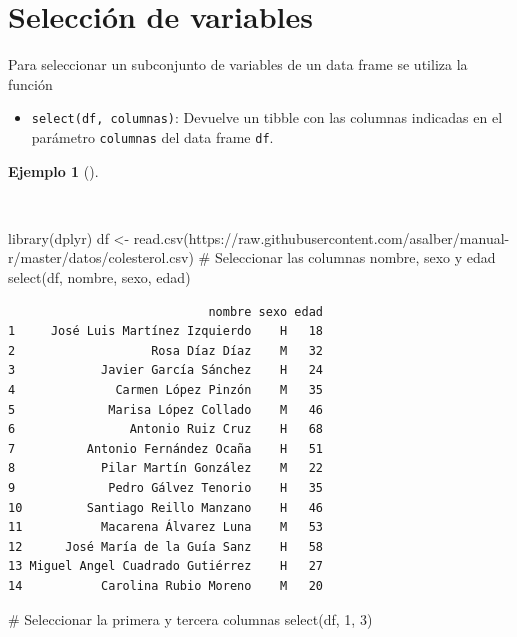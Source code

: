 \documentclass[
  a4paper,
]{scrreport}
\newenvironment{Shaded}{\begin{snugshade}}{\end{snugshade}}
\newcommand{\CommentTok}[1]{\textcolor[rgb]{0.37,0.37,0.37}{#1}}
\newcommand{\DecValTok}[1]{\textcolor[rgb]{0.68,0.00,0.00}{#1}}
\newcommand{\FunctionTok}[1]{\textcolor[rgb]{0.28,0.35,0.67}{#1}}
\newcommand{\NormalTok}[1]{\textcolor[rgb]{0.00,0.23,0.31}{#1}}
\newcommand{\OtherTok}[1]{\textcolor[rgb]{0.00,0.23,0.31}{#1}}
\newcommand{\StringTok}[1]{\textcolor[rgb]{0.13,0.47,0.30}{#1}}
\providecommand{\tightlist}{%
  \setlength{\itemsep}{0pt}\setlength{\parskip}{0pt}}\usepackage{longtable,booktabs,array}
\theoremstyle{definition}
\theoremstyle{definition}
\newtheorem{example}{Ejemplo}[chapter]
\theoremstyle{remark}
\begin{document}
\section{Selección de variables}\label{selecciuxf3n-de-variables}

Para seleccionar un subconjunto de variables de un data frame se utiliza
la función

\begin{itemize}
\tightlist
\item
  \texttt{select(df,\ columnas)}: Devuelve un tibble con las columnas
  indicadas en el parámetro \texttt{columnas} del data frame
  \texttt{df}.
\end{itemize}

\begin{example}[]\protect\hypertarget{exm-select}{}\label{exm-select}

~

\begin{Shaded}
\begin{Highlighting}[]
\FunctionTok{library}\NormalTok{(dplyr)}
\NormalTok{df }\OtherTok{\textless{}{-}} \FunctionTok{read.csv}\NormalTok{(}\StringTok{\textquotesingle{}https://raw.githubusercontent.com/asalber/manual{-}r/master/datos/colesterol.csv\textquotesingle{}}\NormalTok{)}
\CommentTok{\# Seleccionar las columnas nombre, sexo y edad}
\FunctionTok{select}\NormalTok{(df, nombre, sexo, edad)}
\end{Highlighting}
\end{Shaded}

\begin{verbatim}
                            nombre sexo edad
1     José Luis Martínez Izquierdo    H   18
2                   Rosa Díaz Díaz    M   32
3            Javier García Sánchez    H   24
4              Carmen López Pinzón    M   35
5             Marisa López Collado    M   46
6                Antonio Ruiz Cruz    H   68
7          Antonio Fernández Ocaña    H   51
8            Pilar Martín González    M   22
9             Pedro Gálvez Tenorio    H   35
10         Santiago Reillo Manzano    H   46
11           Macarena Álvarez Luna    M   53
12      José María de la Guía Sanz    H   58
13 Miguel Angel Cuadrado Gutiérrez    H   27
14           Carolina Rubio Moreno    M   20
\end{verbatim}

\begin{Shaded}
\begin{Highlighting}[]
\CommentTok{\# Seleccionar la primera y tercera columnas}
\FunctionTok{select}\NormalTok{(df, }\DecValTok{1}\NormalTok{, }\DecValTok{3}\NormalTok{)}
\end{Highlighting}
\end{Shaded}


\end{example}
\end{document}
